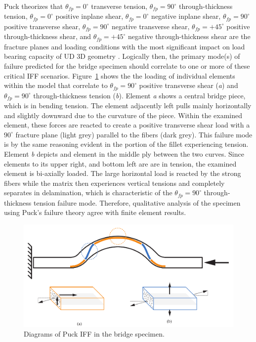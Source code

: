 Puck theorizes that $\theta_{fp} = 0^{\circ}$ transverse tension, $\theta_{fp} = 90^{\circ}$ through-thickness tension, $\theta_{fp} = 0^{\circ}$ positive inplane shear, $\theta_{fp} = 0^{\circ}$ negative inplane shear, $\theta_{fp} = 90^{\circ}$ positive transverse shear, $\theta_{fp} = 90^{\circ}$ negative transverse shear, $\theta_{fp} = +45^{\circ}$ positive through-thickness shear, and $\theta_{fp} = +45^{\circ}$ negative through-thickness shear are the fracture planes and loading conditions with the most significant impact on load bearing capacity of UD 3D geometry \cite{Puck-Stuttgard}. Logically then, the primary mode(s) of failure predicted for the bridge specimen should correlate to one or more of these critical IFF scenarios. Figure~\ref{fig:puck-failure-qualitative} shows the the loading of individual elements within the model that correlate to $\theta_{fp} = 90^{\circ}$ positive transverse shear (\emph{a}) and $\theta_{fp} = 90^{\circ}$ through-thickness tension (\emph{b}). Element \emph{a} shows a central bridge piece, which is in bending tension. The element adjacently left pulls mainly horizontally and slightly downward due to the curvature of the piece. Within the examined element, these forces are reacted to create a positive transverse shear load with a $90^{\circ}$ fracture plane (light grey) parallel to the fibers (dark grey). This failure mode is by the same reasoning evident in the portion of the fillet experiencing tension. Element \emph{b} depicts and element in the middle ply between the two curves. Since elements to its upper right, and bottom left are are in tension, the examined element is bi-axially loaded. The large horizontal load is reacted by the strong fibers while the matrix then experiences vertical tensions and completely separates in delamination, which is characteristic of the $\theta_{fp} = 90^{\circ}$ through-thickness tension failure mode. Therefore, qualitative analysis of the specimen using Puck's failure theory agree with finite element results.\\

\begin{figure}[htp]
\centering
\includegraphics[width=1\textwidth]{./figures/fea/puck-failure-qualitative}
\caption{Diagrams of Puck IFF in the bridge specimen.}
\label{fig:puck-failure-qualitative}
\end{figure}

